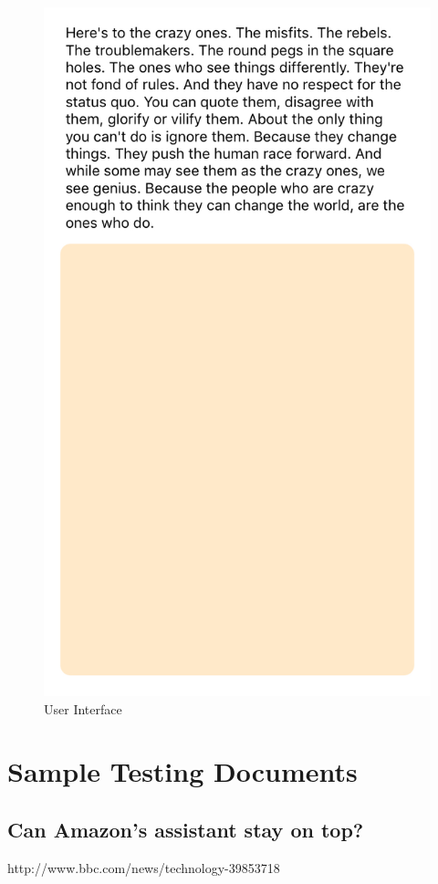 \begin{figure}
	\centering
	\includegraphics[scale = 0.2]{ui}
	\caption{User Interface}
	\label{uipicture}
\end{figure}

\pagebreak

\section{Sample Testing Documents}
\subsection{Can Amazon's assistant stay on top?}
http://www.bbc.com/news/technology-39853718
